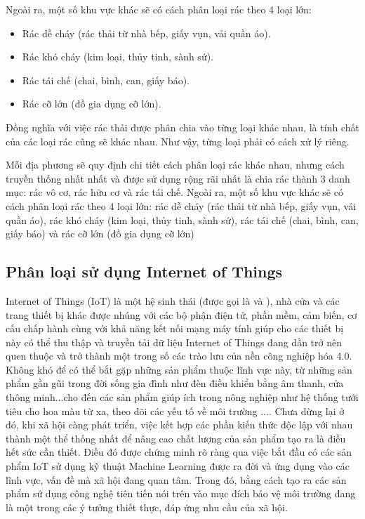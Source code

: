 Ngoài ra, một số khu vực khác sẽ có cách phân loại rác theo 4 loại lớn: 
    \begin{itemize}
        \item Rác dễ cháy (rác thải từ nhà bếp, giấy vụn, vải quần áo).
        \item Rác khó cháy (kim loại, thủy tinh, sành sứ).
        \item Rác tái chế (chai, bình, can, giấy báo).
        \item Rác cỡ lớn (đồ gia dụng cỡ lớn).
    \end{itemize}
  

Đồng nghĩa với việc rác thải được phân chia vào từng loại khác nhau, là tính chất của các loại rác cũng sẽ khác nhau. Như vậy, từng loại phải có cách xử lý riêng.

Mỗi địa phương sẽ quy định chi tiết cách phân loại rác khác nhau, nhưng cách truyền thống nhất nhất và được sử dụng rộng rãi nhất là chia rác thành 3 danh mục: rác vô cơ, rác hữu cơ và rác tái chế.
Ngoài ra, một số khu vực khác sẽ có cách phân loại rác theo 4 loại lớn: rác dễ cháy (rác thải từ nhà bếp, giấy vụn, vải quần áo), rác khó cháy (kim loại, thủy tinh, sành sứ), rác tái chế (chai, bình, can, giấy báo) và rác cỡ lớn (đồ gia dụng cỡ lớn)

\subsection{Phân loại sử dụng Internet of Things}
Internet of Things (IoT) là một hệ sinh thái (được gọi là  và ), nhà cửa và các trang thiết bị khác được nhúng với các bộ phận điện tử, phần mềm, cảm biến, cơ cấu chấp hành cùng với khả năng kết nối mạng máy tính giúp cho các thiết bị này có thể thu thập và truyền tải dữ liệu
Internet of Things đang dần trở nên quen thuộc và trở thành một trong số các trào lưu của nền công nghiệp hóa 4.0.
Không khó để có thể bắt gặp những sản phẩm thuộc lĩnh vực này, từ những sản phẩm gần gũi trong đời sống gia đình như đèn điều khiển bằng âm thanh, cửa thông minh...cho đến các sản phẩm giúp ích trong nông nghiệp như hệ thống tưới tiêu cho hoa màu từ xa, theo dõi các yếu tố về môi trường .... 
Chưa dừng lại ở đó, khi xã hội càng phát triển, việc kết hợp các phần kiến thức độc lập với nhau thành một thể thống nhất để nâng cao chất lượng của sản phẩm tạo ra là điều hết sức cần thiết.
Điều đó được chứng minh rõ ràng qua việc bắt đầu có các sản phẩm IoT sử dụng kỹ thuật Machine Learning được ra đời và ứng dụng vào các lĩnh vực, vấn đề mà xã hội đang quan tâm.
Trong đó, bằng cách tạo ra các sản phẩm sử dụng công nghệ tiên tiến nói trên vào mục đích bảo vệ môi trường đang là một trong các ý tưởng thiết thực, đáp ứng nhu cầu của xã hội.
 
